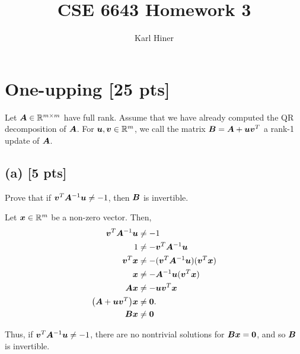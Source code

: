 \documentclass[twoside,10pt]{article}
\begin{document}
\nocite{*}

\title{CSE 6643 Homework 3}
\author{Karl Hiner}
\date{}
\maketitle

\section{One-upping [25 pts]}
Let $\bm{A} \in \mathbb{R}^{m \times m}$ have full rank. Assume that we have already computed the QR decomposition of $\bm{A}$.
For $\bm{u}, \bm{v} \in \mathbb{R}^m$, we call the matrix $\bm{B} = \bm{A} + \bm{u}\bm{v}^{T}$ a rank-1 update of $\bm{A}$. 

\subsection*{(a) [5 pts]}
Prove that if $\bm{v}^{T} \bm{A}^{-1} \bm{u} \neq - 1$, then $\bm{B}$ is invertible.

\quad Let $\bm{x} \in \mathbb{R}^{m}$ be a non-zero vector. Then,
\begin{align*}
  \vct{v}^{T} \mtx{A}^{-1} \vct{u} &\neq -1\\
  1 &\neq -\vct{v}^{T} \mtx{A}^{-1} \vct{u} \\
  \vct{v}^{T} \vct{x} &\neq -(\vct{v}^{T} \mtx{A}^{-1} \vct{u})(\vct{v}^{T} \vct{x}) \\
  \vct{x} &\neq -\mtx{A}^{-1} \mtx{u}(\vct{v}^{T} \vct{x}) \\
  \mtx{A} \vct{x} &\neq -\mtx{u}\vct{v}^{T} \vct{x} \\
  \left(\mtx{A} + \mtx{u}\vct{v}^{T}\right)\vct{x} &\neq \mtx{0}. \\
  \mtx{B}\vct{x} &\neq \vct{0}
\end{align*}

\quad Thus, if $\bm{v}^{T} \bm{A}^{-1} \bm{u} \neq -1$, there are no nontrivial solutions for $\bm{B}\bm{x} = \bm{0}$, and so $\bm{B}$ is invertible.
\end{document}

